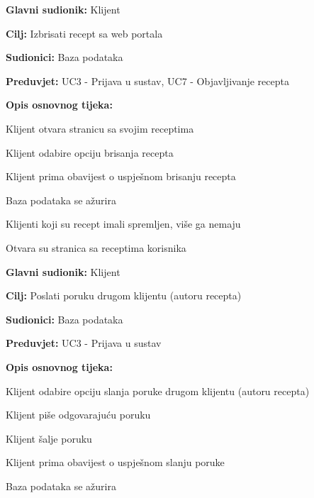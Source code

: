 					\noindent {}
					\begin{packed_item}
	
						\item \textbf{Glavni sudionik: } Klijent
						\item  \textbf{Cilj:} Izbrisati recept sa web portala
						\item  \textbf{Sudionici:} Baza podataka
						\item  \textbf{Preduvjet:} UC3 - Prijava u sustav, UC7 - Objavljivanje recepta
						\item  \textbf{Opis osnovnog tijeka:}
						
						\item[] \begin{packed_enum}
							
							\item Klijent otvara stranicu sa svojim receptima
							\item Klijent odabire opciju brisanja recepta
							\item Klijent prima obavijest o uspješnom brisanju recepta
							\item Baza podataka se ažurira
							\item Klijenti koji su recept imali spremljen, više ga nemaju
							\item Otvara su stranica sa receptima korisnika
						\end{packed_enum}
					\end{packed_item}

					\noindent \underbar{\textbf{UC10 - Slanje poruke}}
					\begin{packed_item}
	
						\item \textbf{Glavni sudionik: } Klijent
						\item  \textbf{Cilj:} Poslati poruku drugom klijentu (autoru recepta) 
						\item  \textbf{Sudionici:} Baza podataka
						\item  \textbf{Preduvjet:} UC3 - Prijava u sustav
						\item  \textbf{Opis osnovnog tijeka:}
						
						\item[] \begin{packed_enum}
							
							\item Klijent odabire opciju slanja poruke drugom klijentu (autoru recepta)
							\item Klijent piše odgovarajuću poruku
							\item Klijent šalje poruku
							\item Klijent prima obavijest o uspješnom slanju poruke
							\item Baza podataka se ažurira
						\end{packed_enum}
					\end{packed_item}


